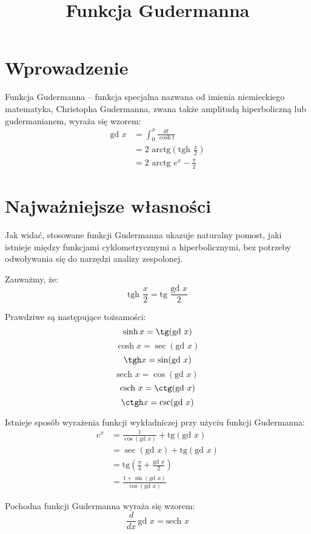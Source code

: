 \documentclass{article}
\begin{document}
\title{Funkcja Gudermanna}
\maketitle

\section*{Wprowadzenie}
Funkcja Gudermanna – funkcja specjalna nazwana od imienia niemieckiego matematyka, Christopha Gudermanna, zwana także amplitudą hiperboliczną lub gudermanianem, wyraża się wzorem: 
\begin{displaymath}
{\begin{aligned}{\text{gd }}x&=\int _{0}^{x}{\frac {dt}{\cosh t}}\\&=2{\text{ arctg}}\left({\text{tgh }}{\frac {x}{2}}\right)\\&=2{\text{ arctg }}e^{x}-{\frac {\pi }{2}}\end{aligned}}
\end{displaymath}

\section*{Najważniejsze własności}
Jak widać, stosowane funkcji Gudermanna ukazuje naturalny pomost, jaki istnieje między funkcjami cyklometrycznymi a hiperbolicznymi, bez potrzeby odwoływania się do narzędzi analizy zespolonej.

Zauważmy, że: 
$$ {\text{tgh }}{\frac {x}{2}}={\text{tg }}{\frac {{\text{gd }}x}{2}} $$

Prawdziwe są następujące tożsamości:
\[ \sinh x = \tg({\text{gd }} x) \]
\[ \cosh x = \sec({\text{gd }} x) \]
\[ \tgh x = \sin({\text{gd }} x) \]
\[ {\text{sech }} x = \cos({\text{gd }} x) \]
\[ {\text{csch }} x = \ctg({\text{gd }} x) \]
\[ \ctgh x = \csc({\text{gd }} x) \]

Istnieje sposób wyrażenia funkcji wykładniczej przy użyciu funkcji Gudermanna: 
$$ {\begin{aligned}e^{x}&={\frac {1}{\cos \left({\text{gd }}x\right)}}+{\text{tg}}\left({\text{gd }}x\right)\\&=\sec \left({\text{gd }}x\right)+{\text{tg}}\left({\text{gd }}x\right)\\&={\text{tg}}\left({\frac {\pi }{4}}+{\frac {{\text{gd }}x}{2}}\right)\\&={\frac {1+\sin \left({\text{gd }}x\right)}{\cos \left({\text{gd }}x\right)}}\end{aligned}} $$

Pochodna funkcji Gudermanna wyraża się wzorem: 
\begin{equation*}
{\frac {d}{dx}}\,{\text{gd }}x={\text{sech }}x
\end{equation*}
\end{document}
